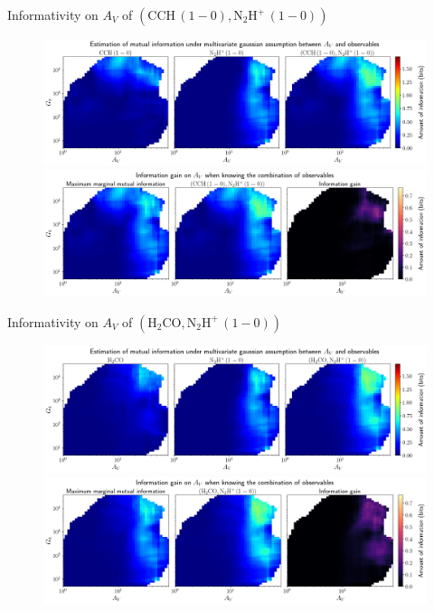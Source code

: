 \documentclass{beamer}
\begin{document}
\begin{frame}{Informativity on $A_V$ of $\left(\mathrm{CCH\,(1-0)},\mathrm{N_2H^+\,(1-0)}\right)$}
    \begin{figure}
        \centering
        \includegraphics[width=0.95\linewidth]{../linearinfogauss/av__cch10_n2hp10_linearinfogauss.png}
        \vfill
        \includegraphics[width=0.95\linewidth]{../linearinfogauss/av__cch10_n2hp10_linearinfogauss_gain.png}
    \end{figure}
\end{frame}

\begin{frame}{Informativity on $A_V$ of $\left(\mathrm{H_2CO},\mathrm{N_2H^+\,(1-0)}\right)$}
    \begin{figure}
        \centering
        \includegraphics[width=0.95\linewidth]{../linearinfogauss/av__h2co_n2hp10_linearinfogauss.png}
        \vfill
        \includegraphics[width=0.95\linewidth]{../linearinfogauss/av__h2co_n2hp10_linearinfogauss_gain.png}
    \end{figure}
\end{frame}
\end{document}
